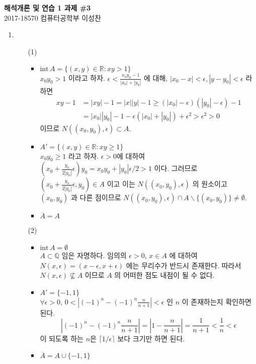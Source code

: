 \documentclass[12pt]{report}
\newcommand{\numl}[1]{\item[\large\textbf{\sffamily #1.}]}
\newcommand{\abs}[1]{\left|#1\right|}
\newcommand{\inte}{\mathrm{int}\,}
\newcommand{\bs}{\backslash}
\newcommand{\R}{\mathbb{R}}
\newcommand{\Q}{\mathbb{Q}}
\begin{document}
\begin{center}
\textbf{\Large 해석개론 및 연습 1 과제 \#3}\\
\large 2017-18570 컴퓨터공학부 이성찬
\end{center}
\begin{enumerate}
\numl{1}
\begin{enumerate}
	\item[(1)]
	\begin{itemize}
		\item $\inte A = \{(x, y) \in \R : xy > 1\}$\\
		$x_0y_0 > 1$ 이라고 하자. $\epsilon < \frac{x_0y_0-1}{\abs{x_0}+\abs{y_0}}$ 에 대해, $\abs{x_0 - x} < \epsilon, \abs{y-y_0}<\epsilon$ 라 하면
		$$\begin{aligned}
			xy - 1 &= \abs{xy} - 1 = \abs{x}\abs{y} - 1 \geq (\abs{x_0} - \epsilon)(\abs{y_0} - \epsilon) - 1\\
			&= \abs{x_0}\abs{y_0} - 1 - \epsilon(\abs{x_0} + \abs{y_0}) + \epsilon^2 > \epsilon^2 > 0
		\end{aligned}$$
		이므로 $N((x_0, y_0), \epsilon) \subset A$.
		\item $A' = \{(x, y) \in \R : xy \geq 1\}$\\
		$x_0y_0\geq 1$ 라고 하자. $\epsilon>0$에 대하여 $(x_0 + \frac{y_0}{2\abs{y_0}}\epsilon)y_0 = x_0y_0 + \abs{y_0}\epsilon/2 > 1$ 이다. 그러므로 $(x_0+\frac{y_0}{2\abs{y_0}}\epsilon, y_0)\in A$ 이고 이는 $N((x_0, y_0), \epsilon)$ 의 원소이고 $(x_0, y_0)$ 과 다른 점이므로 $N((x_0, y_0), \epsilon) \cap A\bs\{(x_0, y_0) \} \neq \emptyset$.
		\item $\overline{A} = A$
	\end{itemize}

	\item[(2)]
	\begin{itemize}
		\item $\inte A = \emptyset$\\
		$A\subset \Q$ 임은 자명하다. 임의의 $\epsilon>0$, $x\in A$ 에 대하여 $N(x, \epsilon) = (x - \epsilon,  x + \epsilon)$ 에는 무리수가 반드시 존재한다. 따라서 $N(x, \epsilon) \nsubseteq A$ 이므로 $A$ 의 어떠한 점도 내점이 될 수 없다.
		\item $A' = \{-1, 1\}$\\
		$\forall \epsilon>0$, $0 < \abs{(-1)^n - (-1)^n \frac{n}{n+1}} < \epsilon$ 인 $n$ 이 존재하는지 확인하면 된다.
		$$\abs{(-1)^n - (-1)^n \frac{n}{n+1}} = \abs{1 - \frac{n}{n+1}} = \frac{1}{n+1} < \frac{1}{n} < \epsilon$$
		이 되도록 하는 $n$은 $\lceil1/\epsilon \rceil$ 보다 크기만 하면 된다.
		\item $\overline{A} = A \cup \{-1, 1\}$
	\end{itemize}


\end{enumerate}
\end{enumerate}
\end{document}
